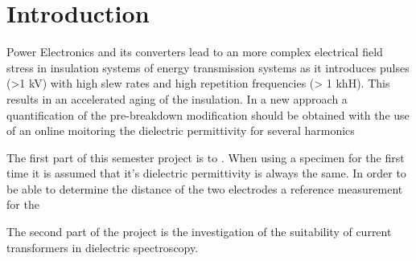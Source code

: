 
\chapter{Introduction}
Power Electronics and its converters lead to an more complex electrical field stress in insulation systems of energy transmission systems as it introduces pulses (>1 kV) with high slew rates and high repetition frequencies (> 1 khH). This results in an accelerated aging of the insulation. In a new approach a quantification of the pre-breakdown modification should be obtained with the use of an online moitoring the dielectric permittivity for several harmonics %

The first part of this semester project is to . When using a specimen for the first time it is assumed that it's dielectric permittivity is always the same. In order to be able to determine the distance of the two electrodes a reference measurement for the 

The second part of the project is the investigation of the suitability of current transformers in dielectric spectroscopy. 

